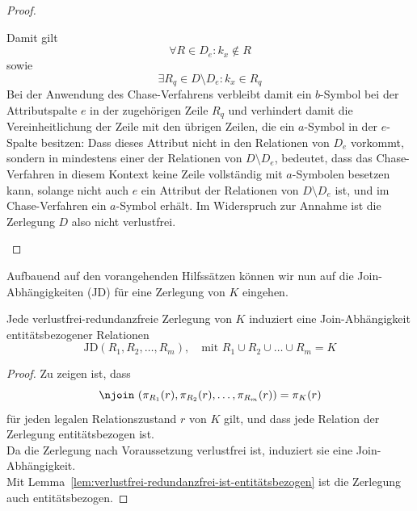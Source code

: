 \begin{proof}
\begin{itemize}
\begin{itemize}
\begin{itemize}
                Damit gilt
                \[
                    \forall R \in D_e: k_x \notin R
                \]
                sowie
                \[
                    \exists R_{q} \in D \setminus D_e: k_x \in R_{q}
                \]
                Bei der Anwendung des Chase-Verfahrens verbleibt damit ein $b$-Symbol bei der Attributspalte $e$ in der zugehörigen Zeile $R_{q}$ und verhindert damit die Vereinheitlichung der Zeile mit den übrigen Zeilen, die ein $a$-Symbol in der $e$-Spalte besitzen:
                Dass dieses Attribut nicht in den Relationen von $D_e$ vorkommt, sondern in mindestens einer der Relationen von $D \setminus D_e$, bedeutet, dass das Chase-Verfahren in diesem Kontext keine Zeile vollständig mit $a$-Symbolen besetzen kann, solange nicht auch $e$ ein Attribut der Relationen von $D \setminus D_e$ ist, und im Chase-Verfahren ein $a$-Symbol erhält.
                Im Widerspruch zur Annahme ist die Zerlegung $D$ also nicht verlustfrei.
            \end{itemize}

        \end{itemize}
    \end{itemize}



\end{proof}

\noindent
Aufbauend auf den vorangehenden Hilfssätzen können wir nun auf die Join-Abhängigkeiten (JD) für eine Zerlegung von ${K}$ eingehen.

\bigskip
\begin{corollary}\label{cor:k_joinabhaengigkeiten}
    Jede verlustfrei-redundanzfreie Zerlegung von $K$ induziert eine Join-Abhängigkeit entitätsbezogener Relationen
    \[
        \text{JD}(R_{1}, R_{2}, \ldots, R_{m}),\quad \text{mit } R_{1} \cup R_{2} \cup \ldots \cup R_{m} = K
    \]
\end{corollary}
\begin{proof}
    Zu zeigen ist, dass
    \[
        \njoin\ (\pi_{R_{1}}(r), \pi_{R_{2}}(r), \ldots, \pi_{R_{m}}(r)) = \pi_{K}(r)
    \]
    \noindent
    für jeden legalen Relationszustand $r$ von $K$ gilt, und dass jede Relation der Zerlegung entitätsbezogen ist.\\

    \noindent
    Da die Zerlegung nach Voraussetzung verlustfrei ist, induziert sie eine Join-Abhängigkeit.\\
    Mit Lemma~\ref{lem:verlustfrei-redundanzfrei-ist-entitätsbezogen} ist die Zerlegung auch entitätsbezogen.
\end{proof}
\bigskip

